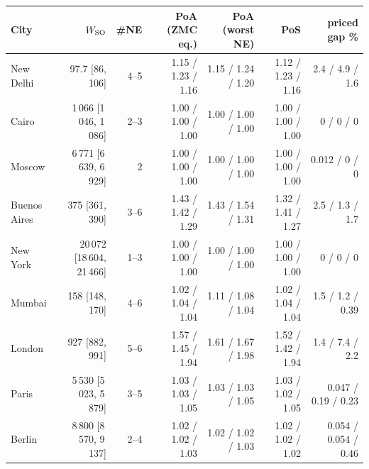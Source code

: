 \begin{tabular}{lrrrrrr}
\toprule
City & $W_{\rm SO}$ & \#NE & PoA (ZMC eq.) & PoA (worst NE) & PoS & priced gap \% \\
\midrule
New Delhi & 97.7 [86, 106] & 4--5 & 1.15 / 1.23 / 1.16 & 1.15 / 1.24 / 1.20 & 1.12 / 1.23 / 1.16 & 2.4 / 4.9 / 1.6 \\
Cairo & 1\,066 [1\,046, 1\,086] & 2--3 & 1.00 / 1.00 / 1.00 & 1.00 / 1.00 / 1.00 & 1.00 / 1.00 / 1.00 & 0 / 0 / 0 \\
Moscow & 6\,771 [6\,639, 6\,929] & 2 & 1.00 / 1.00 / 1.00 & 1.00 / 1.00 / 1.00 & 1.00 / 1.00 / 1.00 & 0.012 / 0 / 0 \\
Buenos Aires & 375 [361, 390] & 3--6 & 1.43 / 1.42 / 1.29 & 1.43 / 1.54 / 1.31 & 1.32 / 1.41 / 1.27 & 2.5 / 1.3 / 1.7 \\
New York & 20\,072 [18\,604, 21\,466] & 1--3 & 1.00 / 1.00 / 1.00 & 1.00 / 1.00 / 1.00 & 1.00 / 1.00 / 1.00 & 0 / 0 / 0 \\
Mumbai & 158 [148, 170] & 4--6 & 1.02 / 1.04 / 1.04 & 1.11 / 1.08 / 1.04 & 1.02 / 1.04 / 1.04 & 1.5 / 1.2 / 0.39 \\
London & 927 [882, 991] & 5--6 & 1.57 / 1.45 / 1.94 & 1.61 / 1.67 / 1.98 & 1.52 / 1.42 / 1.94 & 1.4 / 7.4 / 2.2 \\
Paris & 5\,530 [5\,023, 5\,879] & 3--5 & 1.03 / 1.03 / 1.05 & 1.03 / 1.03 / 1.05 & 1.03 / 1.02 / 1.05 & 0.047 / 0.19 / 0.23 \\
Berlin & 8\,800 [8\,570, 9\,137] & 2--4 & 1.02 / 1.02 / 1.03 & 1.02 / 1.02 / 1.03 & 1.02 / 1.02 / 1.02 & 0.054 / 0.054 / 0.46 \\
\bottomrule
\end{tabular}
